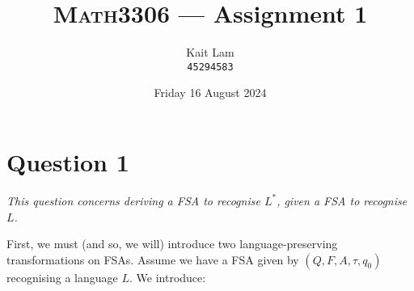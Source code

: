 \documentclass[a4paper]{article}
\author{Kait Lam \\ \small \texttt{45294583}}
\title{\textsc{Math3306} --- Assignment 1}
\date{Friday 16 August 2024}
\begin{document}
\maketitle


\section*{Question 1}
\begin{center}
  \textit{This question concerns deriving a FSA to recognise $L^*$, given a FSA to recognise $L$.}
\end{center}

\noindent First, we must (and so, we will)
introduce two language-preserving transformations on FSAs.
Assume we have a FSA given by $(Q, F, A, \tau, q_0)$ recognising a language $L$.
We introduce:
\end{document}
